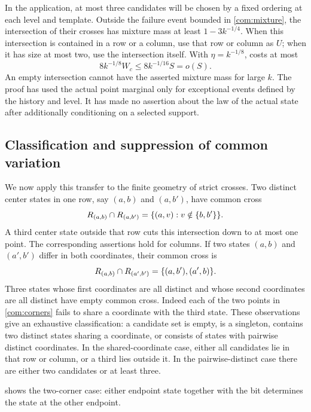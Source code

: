 In the application, at most three candidates will be chosen by a fixed
ordering at each level and template. Outside the failure event bounded in
\eqref{com:mixture}, the intersection of their crosses has mixture mass at
least \(1-3k^{-1/4}\). When this intersection is contained in a row or a
column, use that row or column as \(U\); when it has size at most two, use the
intersection itself. With \(\eta=k^{-1/8}\),  costs at most
\[
 8k^{-1/8}W_c\le8k^{-1/16}S=o(S).
\]
An empty intersection cannot have the asserted mixture mass for large \(k\).
The proof has used the actual point marginal only for exceptional events
defined by the history and level. It has made no assertion about the law of
the actual state after additionally conditioning on a selected support.

\subsection{Classification and suppression of common variation}

We now apply this transfer to the finite geometry of strict crosses. Two
distinct center states in one row, say \((a,b)\) and \((a,b')\), have common
cross
\begin{equation}\label{com:row-intersection}
 R_{(a,b)}\cap R_{(a,b')}
       =\{(a,v):v\notin\{b,b'\}\}.
\end{equation}
A third center state outside that row cuts this intersection down to at most
one point. The corresponding assertions hold for columns. If two states
\((a,b)\) and \((a',b')\) differ in both coordinates, their common cross is
\begin{equation}\label{com:corners}
 R_{(a,b)}\cap R_{(a',b')}
       =\{(a,b'),(a',b)\}.
\end{equation}
Three states whose first coordinates are all distinct and whose second
coordinates are all distinct have empty common cross. Indeed each of the
two points in \eqref{com:corners} fails to share a coordinate with the third
state. These observations give an exhaustive classification: a candidate
set is empty, is a singleton, contains two distinct states sharing a
coordinate, or consists of states with pairwise distinct coordinates.
In the shared-coordinate case, either all candidates lie in that row or
column, or a third lies outside it. In the pairwise-distinct case there
are either two candidates or at least three.

 shows the two-corner case: either endpoint state
together with the bit determines the state at the other endpoint.


